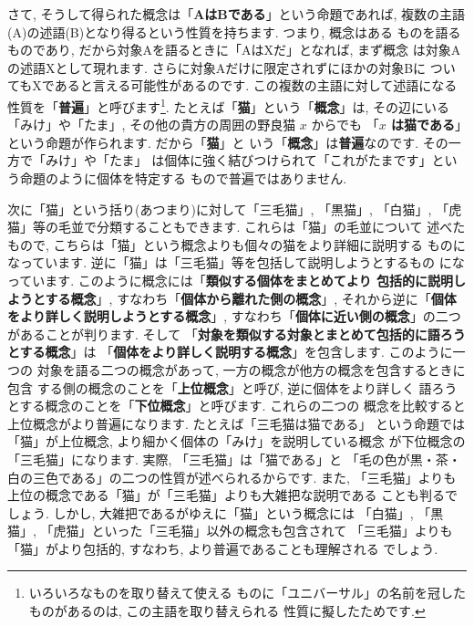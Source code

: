 \documentclass[b5j,8pt,twocolumn]{ltjsarticle}
\begin{document}
さて, そうして得られた概念は「\textbf{AはBである}」という命題であれば,
 複数の主語(A)の述語(B)となり得るという性質を持ちます. つまり, 概念はある
ものを語るものであり, だから対象Aを語るときに「AはXだ」となれば, まず概念
は対象Aの述語Xとして現れます. さらに対象Aだけに限定されずにほかの対象Bに
ついてもXであると言える可能性があるのです. この複数の主語に対して述語になる
性質を「\textbf{普遍}」と呼びます\footnote{いろいろなものを取り替えて使える
ものに「ユニバーサル」の名前を冠したものがあるのは, この主語を取り替えられる
性質に擬したためです.}. たとえば「\textbf{猫}」という「\textbf{概念}」は,
 その辺にいる「みけ」や「たま」, その他の貴方の周囲の野良猫 $x$ からでも
「\textbf{$x$ は猫である}」という命題が作られます. だから「\textbf{猫}」と
いう「\textbf{概念}」は\textbf{普遍}なのです. その一方で「みけ」や「たま」
は個体に強く結びつけられて「これがたまです」という命題のように個体を特定する
もので普遍ではありません. 
\newline

次に「猫」という括り(あつまり)に対して「三毛猫」, 「黒猫」, 「白猫」,
 「虎猫」等の毛並で分類することもできます. これらは「猫」の毛並について
述べたもので, こちらは「猫」という概念よりも個々の猫をより詳細に説明する
ものになっています. 逆に「猫」は「三毛猫」等を包括して説明しようとするもの
になっています. このように概念には「\textbf{類似する個体をまとめてより
包括的に説明しようとする概念}」, すなわち「\textbf{個体から離れた側の概念}」,
 それから逆に「\textbf{個体をより詳しく説明しようとする概念}」, 
 すなわち「\textbf{個体に近い側の概念}」の二つがあることが判ります. そして
「\textbf{対象を類似する対象とまとめて包括的に語ろうとする概念}」は
「\textbf{個体をより詳しく説明する概念}」を包含します. このように一つの
対象を語る二つの概念があって, 一方の概念が他方の概念を包含するときに包含
する側の概念のことを「\textbf{上位概念}」と呼び, 逆に個体をより詳しく
語ろうとする概念のことを「\textbf{下位概念}」と呼びます. これらの二つの
概念を比較すると上位概念がより普遍になります. たとえば「三毛猫は猫である」
という命題では「猫」が上位概念, より細かく個体の「みけ」を説明している概念
が下位概念の「三毛猫」になります. 実際, 「三毛猫」は「猫である」と
「毛の色が黒・茶・白の三色である」の二つの性質が述べられるからです. また,
 「三毛猫」よりも上位の概念である「猫」が「三毛猫」よりも大雑把な説明である
ことも判るでしょう. しかし, 大雑把であるがゆえに「猫」という概念には
「白猫」, 「黒猫」, 「虎猫」といった「三毛猫」以外の概念も包含されて
「三毛猫」よりも「猫」がより包括的, すなわち, より普遍であることも理解される
でしょう. 
\newline
\end{document}
